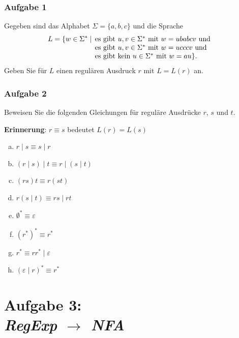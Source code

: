 \documentclass{beamer}
\begin{document}
	\begin{frame} \frametitle{Aufgabe 1}
		\small
		Gegeben sind das Alphabet $\Sigma=\{a,b,c\}$ und die Sprache
		\begin{equation*}
			L= \{w\in \Sigma^\ast \mid
			\begin{array}[t]{@{\,}l}
				\mbox{es gibt } u,v\in \Sigma^\ast \mbox{
					mit } w = u babc v \mbox{ und }\\
				\mbox{es gibt } u,v\in \Sigma^\ast \mbox{
					mit } w = u ccc v \mbox{ und }\\
				\mbox{es gibt kein } u \in \Sigma^\ast
				\mbox{ mit } w = au\} .
			\end{array}
		\end{equation*}	
		Geben Sie für $L$ einen regulären Ausdruck $r$ mit $L=L(r)$ an.
	\end{frame}
	
	\begin{frame} \frametitle{Aufgabe 2}
		\small
		Beweisen Sie die folgenden Gleichungen für reguläre Ausdrücke $r$,
		$s$ und $t$.
		
		\textbf{Erinnerung}: $r\equiv s$ bedeutet $L(r) = L(s)$
		
		\begin{enumerate}[a)]
			\item $r\mid s\equiv s\mid r$
			\item $(r\mid s)\mid t\equiv r\mid (s\mid t)$
			\item $(rs)t\equiv r(st)$
			\item $r(s\mid t)\equiv rs\mid rt$
			\item $\emptyset^\ast\equiv \varepsilon$
			\item $(r^\ast)^\ast\equiv r^\ast$
			\item $r^\ast\equiv rr^\ast\mid \varepsilon$
			\item $(\varepsilon \mid r)^\ast\equiv r^\ast$
		\end{enumerate}
	\end{frame}

	\section{Aufgabe 3: \\ \itshape RegExp $\to$ NFA}
\end{document}
